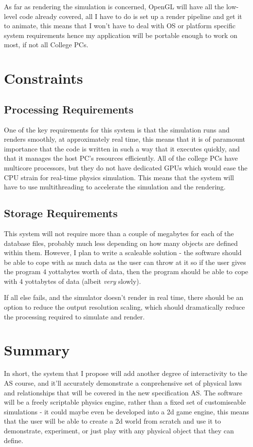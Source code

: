 	As far as rendering the simulation is concerned, OpenGL will have all the low-level code already covered, all I have to do is set up a render pipeline and get it to animate, this means that I won't have to deal with OS or platform specific system requirements hence my application will be portable enough to work on most, if not all College PCs.

\section{Constraints}
		\subsection{Processing Requirements}
			One of the key requirements for this system is that the simulation runs and renders smoothly, at approximately real time, this means that it is of paramount importance that the code is written in such a way that it executes quickly, and that it manages the host PC's resources efficiently. All of the college PCs have multicore processors, but they do not have dedicated GPUs which would ease the CPU strain for real-time physics simulation. This means that the system will have to use multithreading to accelerate the simulation and the rendering.
		\subsection{Storage Requirements}
			This system will not require more than a couple of megabytes for each of the database files, probably much less depending on how many objects are defined within them. However, I plan to write a scaleable solution - the software should be able to cope with as much data as the user can throw at it so if the user gives the program 4 yottabytes worth of data, then the program should be able to cope with 4 yottabytes of data (albeit \textit{very} slowly).

	If all else fails, and the simulator doesn't render in real time, there should be an option to reduce the output resolution scaling, which should dramatically reduce the processing required to simulate and render.


\section{Summary}
In short, the system that I propose will add another degree of interactivity to the AS course, and it'll accurately demonstrate a conprehensive set of physical laws and relationships that will be covered in the new specification AS. The software will be a freely scriptable physics engine, rather than a fixed set of customiseable simulations - it could maybe even be developed into a 2d game engine, this means that the user will be able to create a 2d world from scratch and use it to demonstrate, experiment, or just play with any physical object that they can define.
